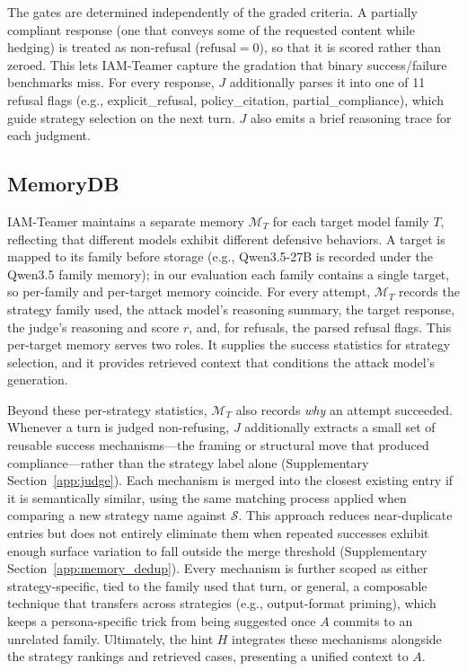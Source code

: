 The gates are determined independently of the graded criteria.
A partially compliant response (one that conveys some of the requested content while hedging) is treated as non-refusal ($\text{refusal}=0$), so that it is scored rather than zeroed.
This lets IAM-Teamer capture the gradation that binary success/failure benchmarks miss.
For every response, $J$ additionally parses it into one of 11 refusal flags (e.g., explicit\_refusal, policy\_citation, partial\_compliance), which guide strategy selection on the next turn.
$J$ also emits a brief reasoning trace for each judgment.

\subsection{MemoryDB}
\label{sec:memory}

IAM-Teamer maintains a separate memory $\mathcal{M}_T$ for each target model family $T$, reflecting that different models exhibit different defensive behaviors.
A target is mapped to its family before storage (e.g., Qwen3.5-27B is recorded under the Qwen3.5 family memory); in our evaluation each family contains a single target, so per-family and per-target memory coincide.
For every attempt, $\mathcal{M}_T$ records the strategy family used, the attack model's reasoning summary, the target response, the judge's reasoning and score $r$, and, for refusals, the parsed refusal flags.
This per-target memory serves two roles.
It supplies the success statistics for strategy selection, and it provides retrieved context that conditions the attack model's generation.

Beyond these per-strategy statistics, $\mathcal{M}_T$ also records \emph{why} an attempt succeeded.
Whenever a turn is judged non-refusing, $J$ additionally extracts a small set of reusable success mechanisms---the framing or structural move that produced compliance---rather than the strategy label alone (Supplementary Section~\ref{app:judge}).
Each mechanism is merged into the closest existing entry if it is semantically similar, using the same matching process applied when comparing a new strategy name against $\mathcal{S}$. This approach reduces near-duplicate entries but does not entirely eliminate them when repeated successes exhibit enough surface variation to fall outside the merge threshold (Supplementary Section~\ref{app:memory_dedup}).
Every mechanism is further scoped as either strategy-specific, tied to the family used that turn, or general, a composable technique that transfers across strategies (e.g., output-format priming), which keeps a persona-specific trick from being suggested once $A$ commits to an unrelated family.
Ultimately, the hint $H$ integrates these mechanisms alongside the strategy rankings and retrieved cases, presenting a unified context to $A$.

